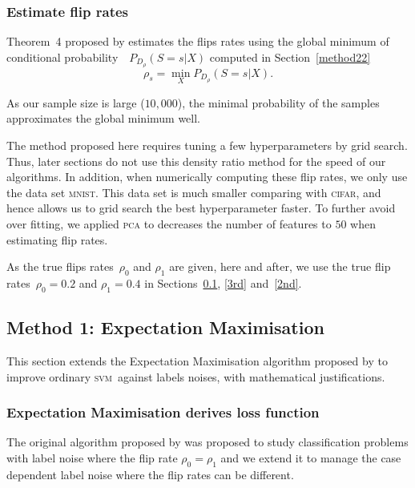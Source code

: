 \documentclass[12pt]{article} %
\newcommand{\svm}{\textsc{svm}}
\begin{document}
\subsubsection{Estimate flip rates}\label{method23}
Theorem~4 proposed by \citet{liu2016classification} estimates the flips rates using the global minimum of conditional probability~~$P_{D_\rho}(S=s|X)$ computed in Section~\ref{method22}
\begin{equation*}\label{eq:fliprate}
\rho_s=\min _X P_{D_\rho}(S=s|X).
\end{equation*}

As our sample size is large ($10,000$), the minimal probability of the samples approximates the global minimum well. 

The method proposed here requires tuning a few hyperparameters by grid search. Thus, later sections do not use this density ratio method for the speed of our algorithms.  
In addition, when numerically computing these flip rates, we only use the data set \textsc{mnist}. This data set is much smaller comparing with \textsc{cifar}, and hence allows us to grid search the best hyperparameter faster. To further avoid over fitting, we applied \textsc{pca} to decreases the number of features to $50$ when estimating flip rates.

As the true flips rates~$\rho_0$ and $\rho_1$ are given, here and after, we use the true flip rates~$\rho_0=0.2$ and $\rho_1=0.4$ in Sections~\ref{1st}, \ref{3rd} and~\ref{2nd}.


\subsection{Method 1: Expectation Maximisation}\label{1st}
This section extends the Expectation Maximisation algorithm proposed by \citet{pmlr-v20-biggio11} to improve ordinary \svm\ against labels noises, with mathematical justifications.
\subsubsection{Expectation Maximisation derives loss function}
The original algorithm proposed by \citet{pmlr-v20-biggio11} was proposed to study classification problems with label noise where the flip rate $\rho_0=\rho_1$ and we extend it to manage the case dependent label noise where the flip rates can be different.
\end{document}
